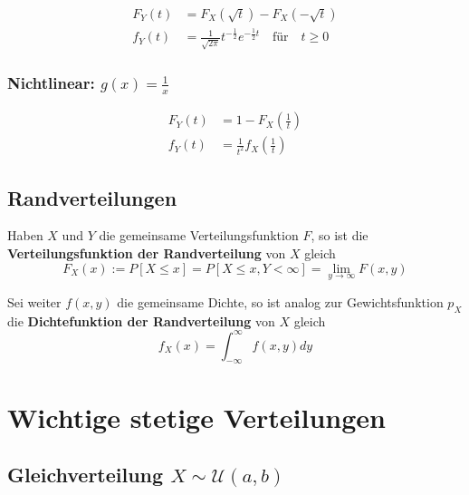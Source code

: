 \documentclass[11pt]{article}
\begin{document}
\begin{equation*}
\begin{split}
	F_Y(t) & = F_X(\sqrt{t}) - F_X(-\sqrt{t}) \\
	f_Y(t) & = \frac{1}{\sqrt{2\pi}}t^{-\frac{1}{2}}e^{-\frac{1}{2}t} \quad\text{f{\"u}r}\quad t \geq 0
\end{split}
\end{equation*}

\subsubsection{Nichtlinear: $g(x) = \frac{1}{x}$}

\begin{equation*}
\begin{split}
	F_Y(t) & = 1 - F_X(\frac{1}{t}) \\
	f_Y(t) & = \frac{1}{t^2}f_X(\frac{1}{t})
\end{split}
\end{equation*}

\subsection{Randverteilungen}

Haben $X$ und $Y$ die gemeinsame Verteilungsfunktion $F$, so ist die \textbf{Verteilungsfunktion der Randverteilung} von $X$ gleich
\begin{equation*}
	F_X(x) := P[X \leq x] = P[X \leq x, Y < \infty] = \lim_{y \rightarrow\infty}F(x,y)
\end{equation*}

Sei weiter $f(x,y)$ die gemeinsame Dichte, so ist analog zur Gewichtsfunktion $p_X$  die \textbf{Dichtefunktion der Randverteilung} von $X$ gleich
\begin{equation*}
	f_X(x) = \int_{-\infty}^\infty f(x,y) dy
\end{equation*}

\section{Wichtige stetige Verteilungen}

\subsection{Gleichverteilung $X \sim \mathcal{U}(a,b)$}
\end{document}
